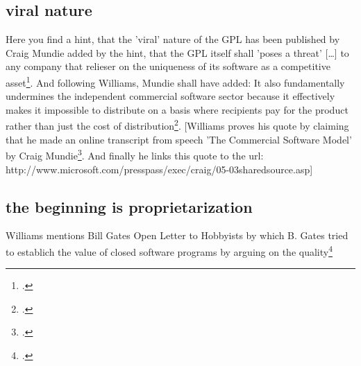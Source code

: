 \documentclass[DIV=calc,BCOR=5mm,11pt,headings=small,oneside,abstract=true, toc=bib]{scrartcl}
\begin{document}
\subsection{viral nature}

Here you find a hint, that the 'viral' nature of the GPL has been published by
Craig Mundie added by the hint, that the GPL itself shall 'poses a threat'
\glqq{}[\ldots] to any company that relieser on the uniqueness of its software
as a competitive asset\grqq{}\footcite[cf][16]{Williams2002a}. And following
Williams, Mundie shall have added: \glqq{}It also fundamentally undermines the
independent commercial software sector because it effectively makes it
impossible to distribute on a basis where recipients pay for the product rather
than just the cost of
distribution\grqq{}\grqq{}\footcite[cf][16]{Williams2002a}. [Williams proves his
quote by claiming that he made an online transcript from speech 'The Commercial
Software Model' by Craig Mundie\footcite[cf][24]{Williams2002a}. And finally he
links this quote to the url:
http://www.microsoft.com/presspass/exec/craig/05-03sharedsource.asp]

\subsection{the beginning is proprietarization}

Williams mentions Bill Gates \glqq{}Open Letter to Hobbyists\grqq{} by which B.
Gates tried to establich the value of closed software programs by arguing on the
quality\footcite[cf][100]{Williams2002a}
\small

\end{document}
